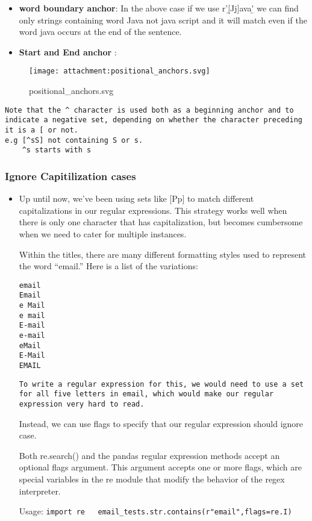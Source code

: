 \documentclass[11pt]{article}
\begin{document}
\begin{itemize}
\item
  \textbf{word boundary anchor}: In the above case if we use
  r'\b[Jj]ava\b' we can find only strings containing word Java not java
  script and it will match even if the word java occurs at the end of
  the sentence.
\item
  \textbf{Start and End anchor }:
\end{itemize}

\begin{figure}
\centering
\texttt{[image: attachment:positional\_anchors.svg]}
\caption{positional\_anchors.svg}
\end{figure}

\begin{verbatim}
Note that the ^ character is used both as a beginning anchor and to indicate a negative set, depending on whether the character preceding it is a [ or not.
e.g [^sS] not containing S or s.
    ^s starts with s
\end{verbatim}

\hypertarget{ignore-capitilization-cases}{%
\subsubsection{Ignore Capitilization
cases}\label{ignore-capitilization-cases}}

\begin{itemize}
\item
  Up until now, we've been using sets like {[}Pp{]} to match different
  capitalizations in our regular expressions. This strategy works well
  when there is only one character that has capitalization, but becomes
  cumbersome when we need to cater for multiple instances.

  Within the titles, there are many different formatting styles used to
  represent the word ``email.'' Here is a list of the variations:

\begin{verbatim}
email
Email
e Mail
e mail
E-mail
e-mail
eMail
E-Mail
EMAIL
\end{verbatim}

\begin{verbatim}
To write a regular expression for this, we would need to use a set for all five letters in email, which would make our regular expression very hard to read.
\end{verbatim}

  Instead, we can use flags to specify that our regular expression
  should ignore case.

  Both re.search() and the pandas regular expression methods accept an
  optional flags argument. This argument accepts one or more flags,
  which are special variables in the re module that modify the behavior
  of the regex interpreter.

  Usage:
  \texttt{import\ re\ \ \ email\_tests.str.contains(r"email",flags=re.I)}
\end{itemize}
\end{document}
